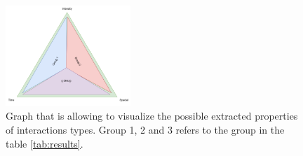 \begin{figure}[h]
    \centering
    \includegraphics[width=0.42\textwidth]{Images/iop_triangle.png}
    \caption{Graph that is allowing to visualize the possible extracted properties of interactions types. Group 1, 2 and 3 refers to the group in the table \ref{tab:results}.}
    
    \vspace{-0.5cm}
    \label{fig:interaction_type_triangle}
    \vspace{0.2cm}
\end{figure}


